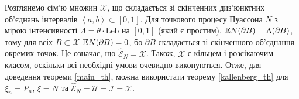 Розглянемо сім'ю множин $\mathcal{X}$, що складається зі
скінченних диз'юнктних об'єд\-нань інтервалів $\left<a,b\right> \subset [0, 1]$.
Для точкового процесу Пуассона $N$
з мірою інтенсивності $\Lambda = \theta \cdot \mathrm{Leb}$ на $[0, 1]$ 
(який є простим),
$\mathbb{E} N(\partial B) = \Lambda (\partial B)$, тому 
для всіх $B \subset \mathcal{X}$ $\mathbb{E} N(\partial B) = 0$, бо
$\partial B$ складається зі скінченного об'єднання окремих точок.
Це означає, що $\hat{\mathcal{E}}_N = \mathcal{X}$.
Також, $\mathcal{X}$ є кільцем і розсікаючим класом, оскільки всі необхідні
умови очевидно виконуються.
Отже, для доведення теореми \ref{main_th}, можна використати теорему
\ref{kallenberg_th}
для $\xi_n = P_n$, $\xi = N$ та
$\hat{\mathcal{E}}_N = \mathcal{U} = \mathcal{I} = \mathcal{X}$.

